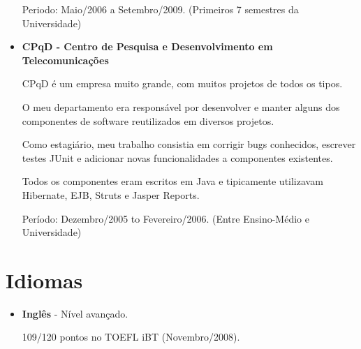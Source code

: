 \documentclass[a4paper,10pt]{article}
\begin{document}
\begin{itemize}
        Periodo: Maio/2006 a Setembro/2009. {\small(Primeiros 7 semestres da Universidade)}

      \item
        \textbf{CPqD - Centro de Pesquisa e Desenvolvimento em Telecomunicações}

        CPqD é um empresa muito grande, com muitos projetos de todos os tipos.

        O meu departamento era responsável por desenvolver e manter alguns dos componentes de software reutilizados em diversos projetos.

        Como estagiário, meu trabalho consistia em corrigir bugs conhecidos, escrever testes JUnit e adicionar novas funcionalidades a componentes existentes.

        Todos os componentes eram escritos em Java e tipicamente utilizavam Hibernate, EJB, Struts e Jasper Reports.

        Período: Dezembro/2005 to Fevereiro/2006. {\small(Entre Ensino-Médio e Universidade)}
    \end{itemize}

  \section{Idiomas}
    \begin{itemize}
      \item  
        \textbf{Inglês} - Nível avançado.

        109/120 pontos no TOEFL iBT (Novembro/2008).

    \end{itemize}
\end{document}
